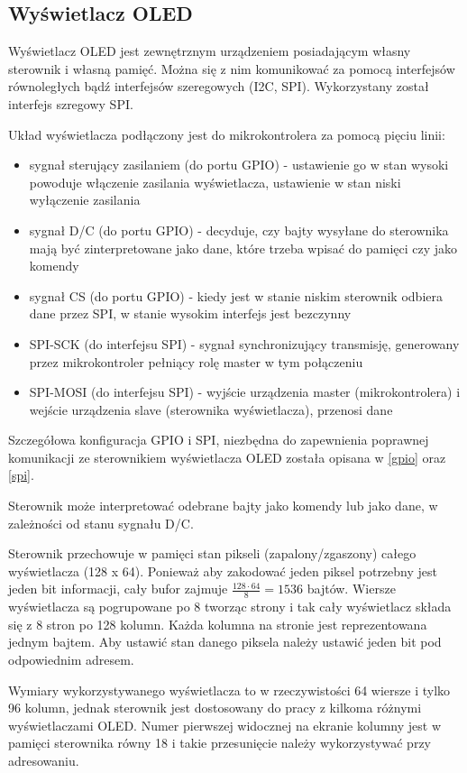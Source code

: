 \subsection{Wyświetlacz OLED}
Wyświetlacz OLED jest zewnętrznym urządzeniem posiadającym własny sterownik i własną pamięć. Można się z nim komunikować za pomocą interfejsów równoległych bądź interfejsów szeregowych (I2C, SPI). Wykorzystany został interfejs szregowy SPI.

Układ wyświetlacza podłączony jest do mikrokontrolera za pomocą pięciu linii:
\begin{itemize}
    \item sygnał sterujący zasilaniem (do portu GPIO) - ustawienie go w stan wysoki powoduje włączenie zasilania wyświetlacza, ustawienie w stan niski wyłączenie zasilania
    \item sygnał D/C (do portu GPIO) - decyduje, czy bajty wysyłane do sterownika mają być zinterpretowane jako dane, które trzeba wpisać do pamięci czy jako komendy
    \item sygnał CS (do portu GPIO) - kiedy jest w stanie niskim sterownik odbiera dane przez SPI, w stanie wysokim interfejs jest bezczynny
    \item SPI-SCK (do interfejsu SPI) - sygnał synchronizujący transmisję, generowany przez mikrokontroler pełniący rolę master w tym połączeniu
    \item SPI-MOSI (do interfejsu SPI) - wyjście urządzenia master (mikrokontrolera) i wejście urządzenia slave (sterownika wyświetlacza), przenosi dane
\end{itemize}

Szczegółowa konfiguracja GPIO i SPI, niezbędna do zapewnienia poprawnej komunikacji ze sterownikiem wyświetlacza OLED została opisana w \ref{gpio} oraz \ref{spi}.

Sterownik może interpretować odebrane bajty jako komendy lub jako dane, w zależności od stanu sygnału D/C.

Sterownik przechowuje w pamięci stan pikseli (zapalony/zgaszony) całego wyświetlacza (128 x 64). Ponieważ aby zakodować jeden piksel potrzebny jest jeden bit informacji, cały bufor zajmuje $\frac{128 \cdot 64}{8}=1536$ bajtów. Wiersze wyświetlacza są pogrupowane po 8 tworząc strony i tak cały wyświetlacz składa się z 8 stron po 128 kolumn. Każda kolumna na stronie jest reprezentowana jednym bajtem. Aby ustawić stan danego piksela należy ustawić jeden bit pod odpowiednim adresem.

Wymiary wykorzystywanego wyświetlacza to w rzeczywistości 64 wiersze i tylko 96 kolumn, jednak sterownik jest dostosowany do pracy z kilkoma różnymi wyświetlaczami OLED. Numer pierwszej widocznej na ekranie kolumny jest w pamięci sterownika równy 18 i takie przesunięcie należy wykorzystywać przy adresowaniu.

